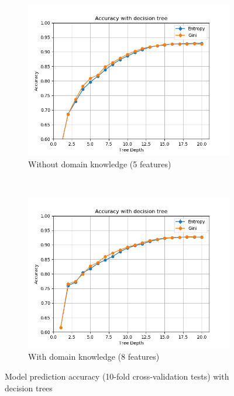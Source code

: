 \documentclass{article}
\begin{document}
\begin{figure}[h!]
    \centering
    \begin{subfigure}[b]{0.45\textwidth}
        \includegraphics[width=\textwidth]{figures/wo_domain_knowledge/accuracy_decision_tree.png}
        \caption{Without domain knowledge (5  features)}
        \label{fig:dt_wo}
    \end{subfigure}
    ~ %
    \begin{subfigure}[b]{0.45\textwidth}
        \includegraphics[width=\textwidth]{figures/w_domain_knowledge/accuracy_decision_tree.png}
        \caption{With domain knowledge (8  features)}
        \label{fig:dt_w}
    \end{subfigure}
    \caption{Model prediction accuracy (10-fold cross-validation tests) with decision trees}
    \label{fig:dt}
\end{figure}
\end{document}
